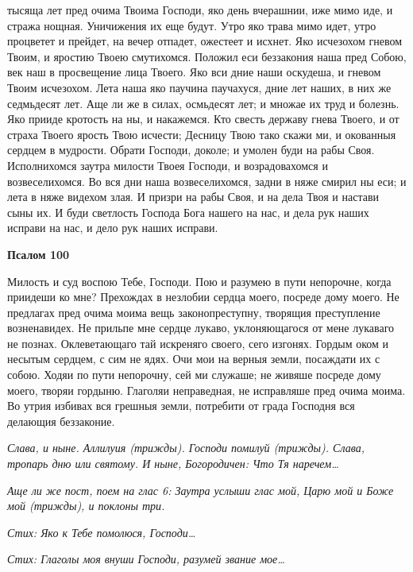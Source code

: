 тысяща лет пред очима Твоима Господи, яко день вчерашнии, иже мимо иде,
и стража нощная. Уничижения их еще будут. Утро яко трава мимо идет,
утро процветет и прейдет, на вечер отпадет, ожестеет и исхнет. Яко
исчезохом гневом Твоим, и яростию Твоею смутихомся. Положил еси
беззакония наша пред Собою, век наш в просвещение лица Твоего. Яко вси
дние наши оскудеша, и гневом Твоим исчезохом. Лета наша яко паучина
паучахуся, дние лет наших, в них же седмьдесят лет. Аще ли же в силах,
осмьдесят лет; и множае их труд и болезнь. Яко прииде кротость на ны, и
накажемся. Кто свесть державу гнева Твоего, и от страха Твоего
ярость Твою исчести; Десницу Твою тако скажи ми, и окованныя
сердцем в мудрости. Обрати Господи, доколе; и умолен буди на рабы
Своя. Исполнихомся заутра милости Твоея Господи, и возрадовахомся
и возвеселихомся. Во вся дни наша возвеселихомся, задни в няже
смирил ны еси; и лета в няже видехом злая. И призри на рабы Своя, и
на дела Твоя и настави сыны их. И буди светлость Господа Бога
нашего на нас, и дела рук наших исправи на нас, и дело рук наших
исправи.






 

\bfseries Псалом 100\normalfont{}


   Милость и суд воспою Тебе, Господи. Пою и разумею в пути непорочне,
когда приидеши ко мне? Прехождах в незлобии сердца моего, посреде дому
моего. Не предлагах пред очима моима вещь законопреступну, творящия
преступление возненавидех. Не прильпе мне сердце лукаво, уклоняющагося
от мене лукаваго не познах. Оклеветающаго тай искреняго своего, сего
изгонях. Гордым оком и несытым сердцем, с сим не ядях. Очи мои
на верныя земли, посаждати их с собою. Ходяи по пути непорочну,
сей ми служаше; не живяше посреде дому моего, творяи гордыню.
Глаголяи неправедная, не исправляше пред очима моима. Во утрия
избивах вся грешныя земли, потребити от града Господня вся делающия
беззаконие.


 \itshape Слава, и ныне\normalfont{}. Аллилуия \itshape (трижды)\normalfont{}. Господи помилуй \itshape (трижды)\normalfont{}. \itshape Слава,
тропарь дню или святому. И ныне, Богородичен:\normalfont{} Что Тя наречем…


 \itshape Аще ли же пост, поем на глас 6:\normalfont{} Заутра услыши глас мой, Царю мой и
Боже мой \itshape (трижды), и поклоны три.\normalfont{}


 \itshape Стих:\normalfont{} Яко к Тебе помолюся, Господи…


 \itshape Стих:\normalfont{} Глаголы моя внуши Господи, разумей звание мое…



